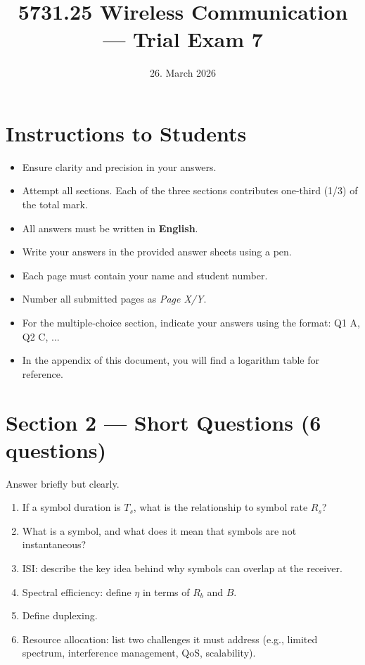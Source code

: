 \documentclass[11pt,a4paper]{article}
\begin{document}
\pagestyle{fancy}
\fancyhf{}
\renewcommand{\headrulewidth}{0pt}
\renewcommand{\footrulewidth}{0pt}
\fancyfoot[R]{\thepage/\pageref{LastPage}}
\fancypagestyle{plain}{
    \fancyhf{}
    \fancyfoot[R]{\thepage/\pageref{LastPage}}
    \renewcommand{\headrulewidth}{0pt}
    \renewcommand{\footrulewidth}{0pt}
}

\title{5731.25 Wireless Communication --- Trial Exam 7}
\date{26. March 2026}
\maketitle

\section*{Instructions to Students}
\begin{itemize}
    \item Ensure clarity and precision in your answers.
    \item Attempt all sections. Each of the three sections contributes one-third (1/3) of the total mark.
    \item All answers must be written in \textbf{English}.
    \item Write your answers in the provided answer sheets using a pen.
    \item Each page must contain your name and student number.
    \item Number all submitted pages as \textit{Page X/Y}.
    \item For the multiple-choice section, indicate your answers using the format: Q1 A, Q2 C, ...
    \item In the appendix of this document, you will find a logarithm table for reference.
\end{itemize}

\newpage

\newpage

\section*{Section 2 --- Short Questions (6 questions)}
Answer briefly but clearly.

\begin{enumerate}[leftmargin=0.9cm]
\item If a symbol duration is $T_s$, what is the relationship to symbol rate $R_s$?

\item What is a symbol, and what does it mean that symbols are not instantaneous?

\item ISI: describe the key idea behind why symbols can overlap at the receiver.

\item Spectral efficiency: define $\eta$ in terms of $R_b$ and $B$.

\item Define duplexing.

\item Resource allocation: list two challenges it must address (e.g., limited spectrum, interference management, QoS, scalability).
\end{enumerate}
\end{document}
